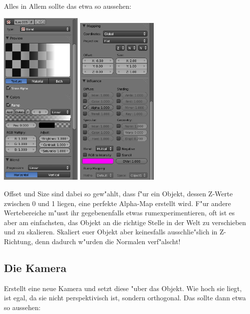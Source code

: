 \documentclass[a4paper]{article}
\begin{document}
Alles in Allem sollte das etwa so aussehen:

\begin{center}
\includegraphics[width=40mm]{../images/blender/bumpmap-texture-3.png}
\includegraphics[width=40mm]{../images/blender/bumpmap-texture-4.png}
\end{center}

Offset und Size sind dabei so gew"ahlt, dass f"ur ein Objekt, dessen Z-Werte zwischen 0 und 1 liegen, eine perfekte Alpha-Map erstellt wird. F"ur andere
Wertebereiche m"usst ihr gegebenenfalls etwas rumexperimentieren, oft ist es aber am einfachsten, das Objekt an die richtige Stelle in der Welt zu
verschieben und zu skalieren. Skaliert euer Objekt aber keinesfalls ausschlie"slich in Z-Richtung, denn dadurch w"urden die Normalen verf"alscht!

\subsection{Die Kamera}
Erstellt eine neue Kamera und setzt diese "uber das Objekt. Wie hoch sie liegt, ist egal, da sie nicht perspektivisch ist, sondern orthogonal. Das sollte
dann etwa so aussehen:
\end{document}
